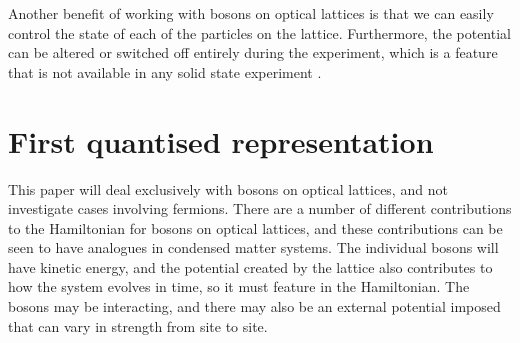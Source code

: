\documentclass[a4paper, 10pt, draft]{article}
\theoremstyle{plain}
\begin{document}
Another benefit of working with bosons on optical lattices is that we can easily
control the state of each of the particles on the lattice. Furthermore, the
potential can be altered or switched off entirely during the experiment, which
is a feature that is not available in any solid state experiment
\cite{Morsch2006}.


\section{First quantised representation}

This paper will deal exclusively with bosons on optical lattices, and not
investigate cases involving fermions. There are a number of different
contributions to the Hamiltonian for bosons on optical lattices, and these
contributions can be seen to have analogues in condensed matter systems. The
individual bosons will have kinetic energy, and the potential created by the
lattice also contributes to how the system evolves in time, so it must feature
in the Hamiltonian. The bosons may be interacting, and there may also be an
external potential imposed that can vary in strength from site to site.
\end{document}
